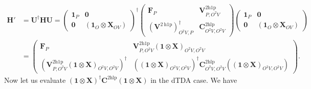 \begin{align}
    \bm{H}' &= \bm{U}^\dag \bm{H} \bm{U} = \begin{pmatrix} \bm{1}_{P} & \bm{0}\\ \bm{0}&\left( \bm{1}_O \otimes \bm{X }_{OV} \right) \end{pmatrix}^\dag \begin{pmatrix} \bm{F}_P & \bm{V}^{2 \mathrm{h1p}}_{P,O^2V}\\ \left(\bm{V}^{2 \mathrm{~h} 1 \mathrm{p}}\right)^{\dagger}_{O^2V,P} & \bm{C}^{2 \mathrm{hlp}}_{O^2V,O^2V} \end{pmatrix} \begin{pmatrix} \bm{1}_P & \bm{0}\\ \bm{0}&\left( \bm{1}_O \otimes \bm{X }_{OV} \right) \end{pmatrix}\\
& = \begin{pmatrix} \bm{F}_P & \bm{V}^{2 \mathrm{h1p}}_{P,O^2V}\left( \bm{1}\otimes \bm{X }\right)_{O^2V,O^2V}\\ \left(\bm{V}^{2 \mathrm{h1p}}_{P,O^2V}\left( \bm{1} \otimes \bm{X } \right)_{O^2V,O^2V}\right)^{\dagger} & \left( \left( \bm{1} \otimes \bm{X } \right)_{O^2V,O^2V}\right)^\dagger \bm{C}^{2 \mathrm{hlp}}_{O^2V,O^2V} \left( \left( \bm{1} \otimes \bm{X } \right)_{O^2V,O^2V} \right) \end{pmatrix}.
\label{eq:booth_upfolded_hamiltonian}
\end{align}
Now let us evaluate $\left( \bm{1} \otimes \bm{X } \right)^\dagger \bm{C}^{2 \mathrm{hlp}} \left( \bm{1} \otimes \bm{X } \right)$ in the dTDA case. We have
